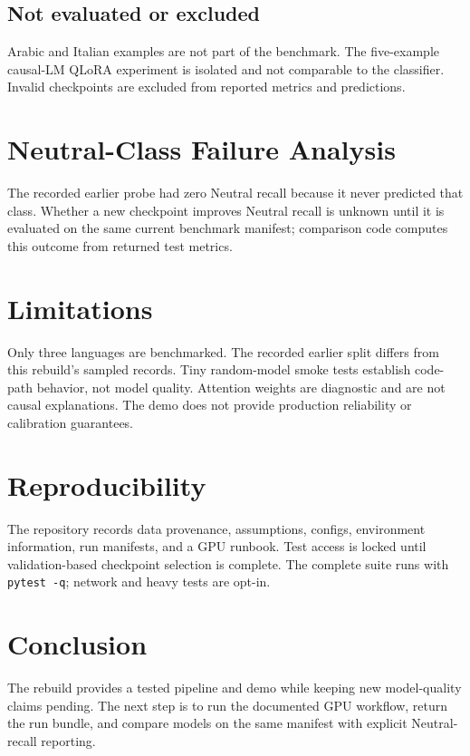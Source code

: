 \documentclass[conference]{IEEEtran}
\begin{document}
\subsection{Not evaluated or excluded}
Arabic and Italian examples are not part of the benchmark. The five-example causal-LM QLoRA
experiment is isolated and not comparable to the classifier. Invalid checkpoints are excluded
from reported metrics and predictions.

\section{Neutral-Class Failure Analysis}
The recorded earlier probe had zero Neutral recall because it never predicted that class.
Whether a new checkpoint improves Neutral recall is unknown until it is evaluated on the same
current benchmark manifest; comparison code computes this outcome from returned test metrics.

\section{Limitations}
Only three languages are benchmarked. The recorded earlier split differs from this rebuild's
sampled records. Tiny random-model smoke tests establish code-path behavior, not model quality.
Attention weights are diagnostic and are not causal explanations. The demo does not provide
production reliability or calibration guarantees.

\section{Reproducibility}
The repository records data provenance, assumptions, configs, environment information, run
manifests, and a GPU runbook. Test access is locked until validation-based checkpoint selection
is complete. The complete suite runs with \texttt{pytest -q}; network and heavy tests are opt-in.

\section{Conclusion}
The rebuild provides a tested pipeline and demo while keeping new model-quality claims pending.
The next step is to run the documented GPU workflow, return the run bundle, and compare models
on the same manifest with explicit Neutral-recall reporting.
\end{document}
